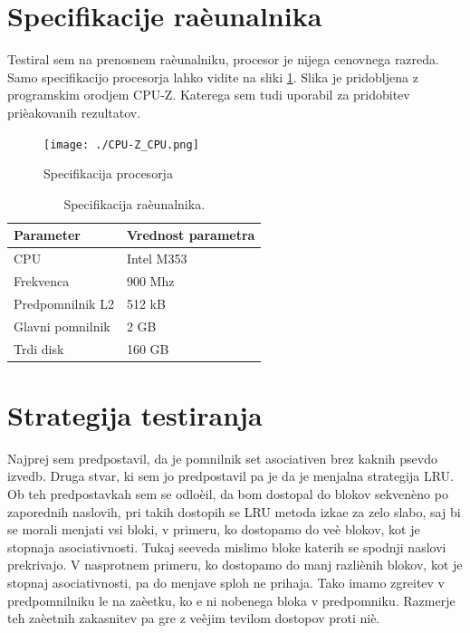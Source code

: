 \documentclass[12pt,a4paper,openany]{book}
\begin{document}
\section{Specifikacije raèunalnika} 
Testiral sem na prenosnem raèunalniku, procesor je nijega cenovnega razreda. Samo specifikacijo procesorja lahko vidite na sliki \ref{slika_spec}. Slika je pridobljena z programskim orodjem CPU-Z. Katerega sem tudi uporabil za pridobitev prièakovanih rezultatov.

\begin{figure}[htb]
 \centering
 \texttt{[image: ./CPU-Z\_CPU.png]}
 \caption{Specifikacija procesorja}
 \label{slika_spec}
\end{figure}

\begin{table}[htb]
\begin{center}
\begin{tabular}{|l||l|}\hline
\textbf{Parameter}& \textbf{Vrednost parametra}\\\hline\hline
CPU	 & Intel M353\\\hline
Frekvenca& 900 Mhz\\\hline
Predpomnilnik L2& 512 kB\\\hline
Glavni pomnilnik & 2 GB\\\hline
Trdi disk & 160 GB\\\hline
\end{tabular}
\end{center}
\caption[Specifikacija raèunalnika.]{Specifikacija raèunalnika.}
\label{tabela_mere}
\end{table}

\section{Strategija testiranja} 
Najprej sem predpostavil, da je pomnilnik set asociativen brez kaknih psevdo izvedb. Druga stvar, ki sem jo predpostavil pa je
da je menjalna strategija LRU.\\
Ob teh predpostavkah sem se odloèil, da bom dostopal do blokov sekvenèno po zaporednih naslovih, pri takih dostopih se LRU metoda
izkae za zelo slabo, saj bi se morali menjati vsi bloki, v primeru, ko dostopamo do veè blokov, kot je stopnaja asociativnosti.
Tukaj seeveda mislimo bloke katerih se spodnji naslovi prekrivajo. V nasprotnem primeru, ko dostopamo do manj razliènih blokov, kot
je stopnaj asociativnosti, pa do menjave sploh ne prihaja. Tako imamo zgreitev v predpomnilniku le na zaèetku, ko e ni nobenega bloka
v predpomniku. Razmerje teh zaèetnih zakasnitev pa gre z veèjim tevilom dostopov proti niè.
\end{document}
